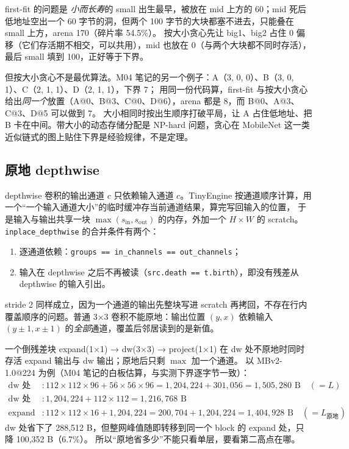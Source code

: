 \documentclass[11pt,a4paper]{ctexart}
\begin{document}
first-fit 的问题是 \emph{小而长寿}的 small 出生最早，被放在 mid 上方的 60；mid 死后低地址空出一个 60 字节的洞，但两个 100 字节的大块都塞不进去，只能叠在 small 上方，arena 170（碎片率 54.5\%）。
按大小贪心先让 big1、big2 占住 0 偏移（它们存活期不相交，可以共用），mid 也放在 0（与两个大块都不同时存活），最后 small 填到 100，正好等于下界。

但按大小贪心不是最优算法。M04 笔记的另一个例子：A（3, 0, 0）、B（3, 0, 1）、C（2, 1, 1）、D（2, 1, 1），下界 7；
用同一份代码算，first-fit 与按大小贪心给出\emph{同一个}放置（A@0、B@3、C@0、D@6），arena 都是 8，而 B@0、A@3、C@3、D@5 可以做到 7。
大小相同时按出生顺序打破平局，让 A 占住低地址、把 B 卡在中间。带大小的动态存储分配是 NP-hard 问题，贪心在 MobileNet 这一类近似链式的图上贴住下界是经验规律，不是定理。

\subsection{原地 depthwise}\label{sec:inplace-method}
depthwise 卷积的输出通道 $c$ 只依赖输入通道 $c$。TinyEngine 按通道顺序计算，用一个“一个输入通道大小”的临时缓冲存当前通道结果，算完写回输入的位置，
于是输入与输出共享一块 $\max(s_\text{in}, s_\text{out})$ 的内存，外加一个 $H\times W$ 的 scratch。\texttt{inplace\_depthwise} 的合并条件有两个：
\begin{enumerate}
  \item 逐通道依赖：\texttt{groups == in\_channels == out\_channels}；
  \item 输入在 depthwise 之后不再被读（\texttt{src.death == t.birth}），即没有残差从 depthwise 的输入引出。
\end{enumerate}
stride 2 同样成立，因为一个通道的输出先整块写进 scratch 再拷回，不存在行内覆盖顺序的问题。普通 3×3 卷积不能原地：输出位置 $(y,x)$ 依赖输入 $(y\pm1, x\pm1)$ 的\emph{全部}通道，覆盖后邻居读到的是新值。

一个倒残差块 expand(1×1) → dw(3×3) → project(1×1) 在 dw 处不原地时同时存活 expand 输出与 dw 输出；原地后只剩 $\max$ 加一个通道。
以 MBv2-1.0@224 为例（M04 笔记的白板估算，与实测下界逐字节一致）：
\begin{align*}
  \text{dw 处（不原地）}&: 112\times112\times96 + 56\times56\times96 = 1{,}204{,}224 + 301{,}056 = 1{,}505{,}280 \text{ B} \quad(= L)\\
  \text{dw 处（原地）}&: 1{,}204{,}224 + 112\times112 = 1{,}216{,}768 \text{ B}\\
  \text{expand 处}&: 112\times112\times16 + 1{,}204{,}224 = 200{,}704 + 1{,}204{,}224 = 1{,}404{,}928 \text{ B} \quad(= L_\text{原地})
\end{align*}
dw 处省下了 288,512 B，但整网峰值随即转移到同一个 block 的 expand 处，只降 100,352 B（6.7\%）。
所以“原地省多少”不能只看单层，要看第二高点在哪。
\end{document}
